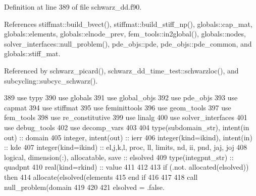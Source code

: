 Definition at line 389 of file schwarz\+\_\+dd.\+f90.



References stiffmat\+::build\+\_\+bvect(), stiffmat\+::build\+\_\+stiff\+\_\+np(), globals\+::cap\+\_\+mat, globals\+::elements, globals\+::elnode\+\_\+prev, fem\+\_\+tools\+::in2global(), globals\+::nodes, solver\+\_\+interfaces\+::null\+\_\+problem(), pde\+\_\+objs\+::pde, pde\+\_\+objs\+::pde\+\_\+common, and globals\+::stiff\+\_\+mat.



Referenced by schwarz\+\_\+picard(), schwarz\+\_\+dd\+\_\+time\+\_\+test\+::schwarzloc(), and subcycling\+::subcyc\+\_\+schwarz().


\begin{DoxyCode}
389       \textcolor{keywordtype}{use }typy
390       \textcolor{keywordtype}{use }globals
391       \textcolor{keywordtype}{use }global_objs
392       \textcolor{keywordtype}{use }pde_objs
393       \textcolor{keywordtype}{use }capmat
394       \textcolor{keywordtype}{use }stiffmat
395       \textcolor{keywordtype}{use }feminittools
396       \textcolor{keywordtype}{use }geom_tools
397       \textcolor{keywordtype}{use }fem_tools
398       \textcolor{keywordtype}{use }re_constitutive
399       \textcolor{keywordtype}{use }linalg
400       \textcolor{keywordtype}{use }solver_interfaces
401       \textcolor{keywordtype}{use }debug_tools     
402       \textcolor{keywordtype}{use }decomp_vars
403       
404       \textcolor{keywordtype}{type}(subdomain_str), \textcolor{keywordtype}{intent(in out)} :: domain 
405       \textcolor{keywordtype}{integer}, \textcolor{keywordtype}{intent(out)} :: ierr
406       \textcolor{keywordtype}{integer(kind=ikind)}, \textcolor{keywordtype}{intent(in)} :: kde
407       \textcolor{keywordtype}{integer(kind=ikind)} :: el,j,k,l, proc, ll, limits, nd, ii, pnd, jaj\textcolor{comment}{, joj}
408 \textcolor{comment}{      }\textcolor{keywordtype}{logical}, \textcolor{keywordtype}{dimension(:)}, \textcolor{keywordtype}{allocatable}, \textcolor{keywordtype}{save} :: elsolved
409       \textcolor{keywordtype}{type}(integpnt_str) :: quadpnt
410       \textcolor{keywordtype}{real(kind=rkind)} :: value
411 
412       
413       \textcolor{keywordflow}{if} (.not. \textcolor{keyword}{allocated}(elsolved)) \textcolor{keywordflow}{then}
414         \textcolor{keyword}{allocate}(elsolved(elements%
415 \textcolor{keywordflow}{      end if}
416       
417       
418       \textcolor{keyword}{call }null_problem(domain%
419 
420       
421       elsolved = .false. 

\end{DoxyCode}
